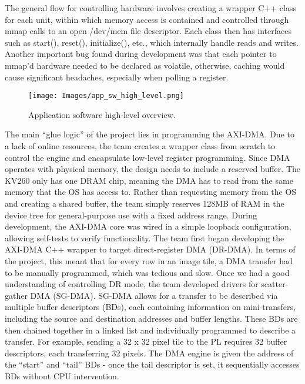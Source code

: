\documentclass{article}
\begin{document}
    \par The general flow for controlling hardware involves creating a wrapper C++ class for each unit, within which memory access is contained and controlled through mmap calls to an open /dev/mem file descriptor. Each class then has interfaces such as start(), reset(), initialize(), etc., which internally handle reads and writes. Another important bug found during development was that each pointer to mmap’d hardware needed to be declared as volatile, otherwise, caching would cause significant headaches, especially when polling a register.

    \begin{figure}[!tb] 
        \centering
        \texttt{[image: Images/app\_sw\_high\_level.png]} 
        \caption{Application software high-level overview.} 
        \label{fig:app_sw_high_level} 
    \end{figure}

    \par The main “glue logic” of the project lies in programming the AXI-DMA. Due to a lack of online resources, the team creates a wrapper class from scratch to control the engine and encapsulate low-level register programming. Since DMA operates with physical memory, the design needs to include a reserved buffer. The KV260 only has one DRAM chip, meaning the DMA has to read from the same memory that the OS has access to. Rather than requesting memory from the OS and creating a shared buffer, the team simply reserves 128MB of RAM in the device tree for general-purpose use with a fixed address range. During development, the AXI-DMA core was wired in a simple loopback configuration, allowing self-tests to verify functionality. The team first began developing the AXI-DMA C++ wrapper to target direct-register DMA (DR-DMA). In terms of the project, this meant that for every row in an image tile, a DMA transfer had to be manually programmed, which was tedious and slow. Once we had a good understanding of controlling DR mode, the team developed drivers for scatter-gather DMA (SG-DMA). SG-DMA allows for a transfer to be described via multiple buffer descriptors (BDs), each containing information on mini-transfers, including the source and destination addresses and buffer lengths. These BDs are then chained together in a linked list and individually programmed to describe a transfer. For example, sending a 32 x 32 pixel tile to the PL requires 32 buffer descriptors, each transferring 32 pixels. The DMA engine is given the address of the “start” and “tail” BDs - once the tail descriptor is set, it sequentially accesses BDs without CPU intervention. 
\end{document}

